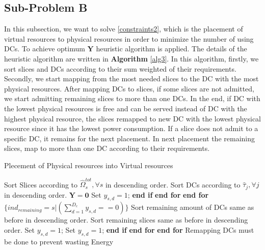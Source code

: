 \documentclass[conference]{IEEEtran}
\begin{document}
\subsection{Sub-Problem B}
In this subsection, we want to solve  \eqref{constraints2}, which is the placement of virtual resources to physical resources in order to minimize the number of using DCs. 
To achieve optimum $\boldsymbol{Y}$ heuristic algorithm is applied. The details of the heuristic algorithm are written in \textbf{Algorithm} \eqref{alg3}. In this algorithm, firstly, we sort slices and DCs according to their sum weighted of their requirements. Secondly, we start mapping from the most needed slices to the DC with the most physical resources. After mapping DCs to slices, if some slices are not admitted, we start admitting remaining slices to more than one DCs. In the end, if DC with the lowest physical resources is free and can be served instead of DC with the highest physical resource, the slices remapped to new DC with the lowest physical resource since it has the lowest power consumption.  
If a slice does not admit to a specific DC, it remains for the next placement. In next placement the remaining slices, map to more than one DC according to their requirements.
\begin{algorithm}
\caption{Plecement of Physical resources into Virtual resources}\label{alg3}
\begin{algorithmic}[1]
\State Sort Slices according to $\hat{\Omega}_{s}^{tot} , \forall s$ in descending order.
\State Sort DCs according to $\hat{\tau}_j , \forall j$ in descending order. 
\State $\boldsymbol{Y} = \boldsymbol{0}$
\State Set $y_{s,d} = 1$;
\EndIf 
\State \textbf{end if}
\EndFor 
\State \textbf{end for}
\EndFor 
\State \textbf{end for}
\State  $\{ind_{remaining} = s|({\sum_{d=1}^{D_c}y_{s,d}==0})\}$
\State Sort remaining amount of DCs same as before in descending order.
\State Sort remaining slices same as before in descending order.
\State Set $y_{s,d} = 1$;
\State Set $y_{s,d} = 1$;
\EndIf 
\State \textbf{end if}
\EndFor 
\State \textbf{end for}
\EndFor 
\State \textbf{end for}
\State Remapping DCs must be done to prevent wasting Energy
\end{algorithmic}
\end{algorithm}
\end{document}

